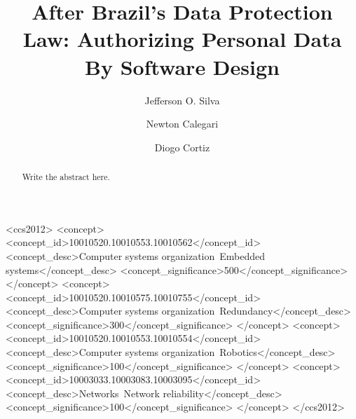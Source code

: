 \documentclass[sigconf]{acmart}
\begin{document}
%
\title{After Brazil's Data Protection Law: Authorizing Personal Data By Software Design}

%
\author{Jefferson O. Silva}

\author{Newton Calegari}

\author{Diogo Cortiz}

%
\renewcommand{\shortauthors}{Silva et al.}

%
\begin{abstract}
Write the abstract here.

\end{abstract}

%
%
\begin{CCSXML}
<ccs2012>
 <concept>
  <concept_id>10010520.10010553.10010562</concept_id>
  <concept_desc>Computer systems organization~Embedded systems</concept_desc>
  <concept_significance>500</concept_significance>
 </concept>
 <concept>
  <concept_id>10010520.10010575.10010755</concept_id>
  <concept_desc>Computer systems organization~Redundancy</concept_desc>
  <concept_significance>300</concept_significance>
 </concept>
 <concept>
  <concept_id>10010520.10010553.10010554</concept_id>
  <concept_desc>Computer systems organization~Robotics</concept_desc>
  <concept_significance>100</concept_significance>
 </concept>
 <concept>
  <concept_id>10003033.10003083.10003095</concept_id>
  <concept_desc>Networks~Network reliability</concept_desc>
  <concept_significance>100</concept_significance>
 </concept>
</ccs2012>
\end{CCSXML}
\end{document}
